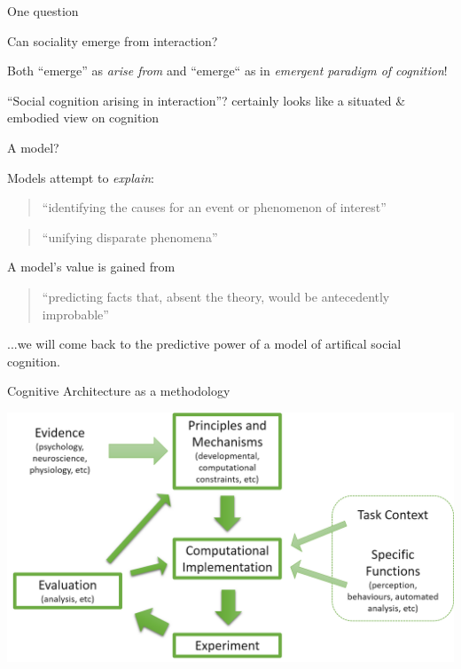 \documentclass[compress]{beamer}
\begin{document}
\begin{frame}{One question}

    \Large
    \centering

    Can sociality emerge from interaction?

    \pause
    \normalsize
    \vspace{2em}

    Both ``emerge'' as \emph{arise from} and ``emerge`` as in \emph{emergent paradigm of
    cognition}!

    \pause

    ``Social cognition arising in interaction''? certainly looks like a situated \&
    embodied view on cognition

\end{frame}

{
\begin{frame}{A model?}

    Models attempt to \emph{explain}: 
    \begin{quote}
        ``identifying the causes for an event or phenomenon of interest''
    \end{quote}
    \begin{quote}
        ``unifying disparate phenomena''
    \end{quote}

        A model's value is gained from
    \begin{quote}
        ``predicting facts that, absent the theory, would be antecedently
        improbable''
    \end{quote}

    \pause

    ...we will come back to the predictive power of a model of artifical social
    cognition.

\end{frame}
}

{
\begin{frame}{Cognitive Architecture as a methodology}

    \begin{center}
        \includegraphics[width=\linewidth]{cogarch-methodology}
    \end{center}

\end{frame}
}
\end{document}
